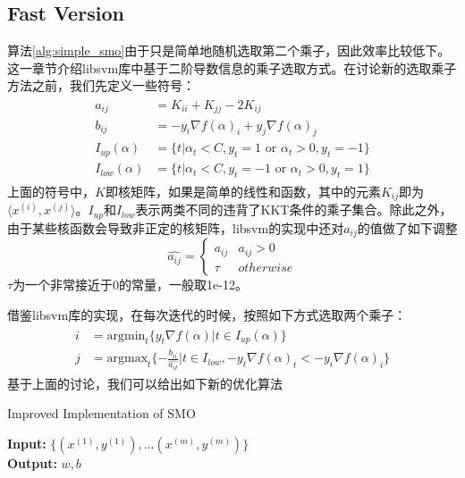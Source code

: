 \documentclass[11pt]{article}
\begin{document}
\subsection{Fast Version}
算法\ref{alg:simple_smo}由于只是简单地随机选取第二个乘子，因此效率比较低下。这一章节介绍libsvm库中基于二阶导数信息的乘子选取方式。在讨论新的选取乘子方法之前，我们先定义一些符号：
\begin{align}
\begin{split}
a_{ij} &= K_{ii}+K_{jj} - 2K_{ij}\\
b_{ij} &= -y_i\nabla f(\alpha)_i + y_j\nabla f(\alpha)_j\\
I_{up}(\alpha) &= \{t|\alpha_t < C, y_t=1\text{ or }\alpha_t > 0, y_t=-1\}\\
I_{low}(\alpha) &= \{t|\alpha_t < C, y_t=-1\text{ or }\alpha_t > 0, y_t=1\}
\end{split}
\end{align}
上面的符号中，$K$即核矩阵，如果是简单的线性和函数，其中的元素$K_{ij}$即为$\langle x^{(i)}, x^{(j)}\rangle$。$I_{up}$和$I_{low}$表示两类不同的违背了KKT条件的乘子集合。除此之外，由于某些核函数会导致非正定的核矩阵，libsvm的实现中还对$a_{ij}$的值做了如下调整
\begin{equation}
\hat{a_{ij}} = \begin{cases}
a_{ij} & a_{ij} > 0\\
\tau & otherwise
\end{cases}
\end{equation}
$\tau$为一个非常接近于0的常量，一般取1e-12。

借鉴libsvm库的实现，在每次迭代的时候，按照如下方式选取两个乘子：
\begin{align}\label{eq:chooseij}
\begin{split}
i &= \text{argmin}_t\{y_t\nabla f(\alpha)|t\in I_{up}(\alpha)\}\\
j &= \text{argmax}_t\{-\frac{b_{ii}}{\hat{a_{it}}}|t\in I_{low},-y_t\nabla f(\alpha)_t < -y_i\nabla f(\alpha)_i\}
\end{split}
\end{align}
基于上面的讨论，我们可以给出如下新的优化算法
\begin{algorithm} 
	\caption{Improved Implementation of SMO}
	\label{alg:complete_smo}
	\textbf{Input:} $\{(x^{(1)}, y^{(1)}),...(x^{(m)}, y^{(m)})\}$\\
	\textbf{Output:} $w, b$
	\begin{algorithmic}[1]
		\Statex
		\EndIf
		\EndWhile
	\end{algorithmic}
\end{algorithm}
\end{document}
